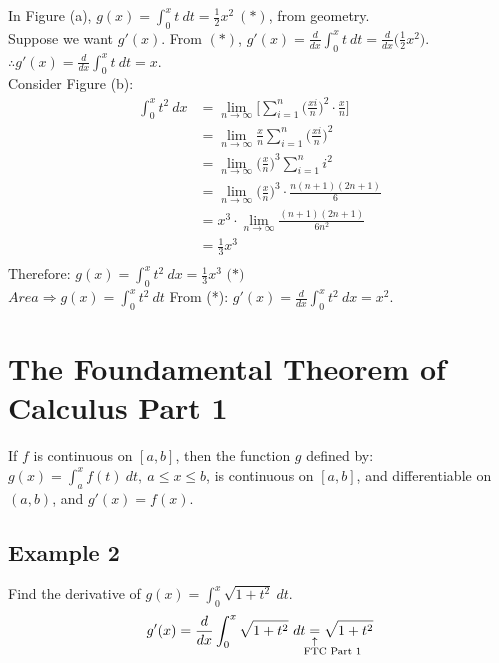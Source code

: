 \documentclass[11pt]{article}
\newcommand{\equalexpl}[1]{%
    \underset{\substack{\uparrow\\\mathrlap{\text{\hspace{-1em}#1}}}}{=}}
\begin{document}
\noindent
In Figure (a), $ \displaystyle{g(x) = \int_{0}^{x}t\ dt = \frac{1}{2}x^2} \ (*)$, from geometry.\\
Suppose we want $ g'(x) $.
From $ (*) $, $ \displaystyle{g'(x)=\frac{d}{dx}\int_{0}^{x}t\ dt=\frac{d}{dx}\Big(\frac{1}{2}x^2\Big)} $.\\
$\therefore \displaystyle{g'(x)=\frac{d}{dx}\int_{0}^{x}t\ dt=x} $.
\\[12pt]
\noindent
Consider Figure (b):
\begin{align*}
    \int_{0}^{x}t^2\ dx
    &= \lim_{n\to\infty}\Big[\sum_{i=1}^{n}\Big(\frac{xi}{n}\Big)^2\cdot\frac{x}{n}\Big]\\
    &= \lim_{n\to\infty}\frac{x}{n}\sum_{i=1}^{n}\Big(\frac{xi}{n}\Big)^2\\
    &= \lim_{n\to\infty}\Big(\frac{x}{n}\Big)^3 \sum_{i=1}^{n}i^2\\
    &= \lim_{n\to\infty}\Big(\frac{x}{n}\Big)^3\cdot \frac{n(n+1)(2n+1)}{6}\\
    &= x^3 \cdot \lim_{n\to\infty}\frac{(n+1)(2n+1)}{6n^2}\\
    &= \frac{1}{3}x^3\\
\end{align*}
$\text{Therefore: } \displaystyle{g(x)=\int_{0}^{x}t^2\ dx=\frac{1}{3}x^3 \text{ (*)}}$\\[3pt]
$ Area \Rightarrow \displaystyle{g(x) = \int_{0}^{x}t^2\ dt} $
From (*): $ \displaystyle{g'(x)=\frac{d}{dx}\int_{0}^{x}t^2\ dx=x^2} $.

\section{The Foundamental Theorem of Calculus Part 1}
\begin{theo}
    If $ f $ is continuous on $ [a,b] $, then the function $ g $ defined by: $ g(x) = \int_{a}^{x}f(t)\ dt,\ a\leq x\leq b $, is continuous on $ [a,b] $, and differentiable on $ (a,b) $, and $ g'(x)=f(x) $.
\end{theo}
\subsection{Example 2}
Find the derivative of $ \displaystyle{g(x)=\int_{0}^{x}\sqrt{1+t^2}\ dt} $.
\[
    g'(x)=\frac{d}{dx}\int_{0}^{x}\sqrt{1+t^2}\ dt\equalexpl{FTC Part 1} \sqrt{1+t^2}
\]
\end{document}
